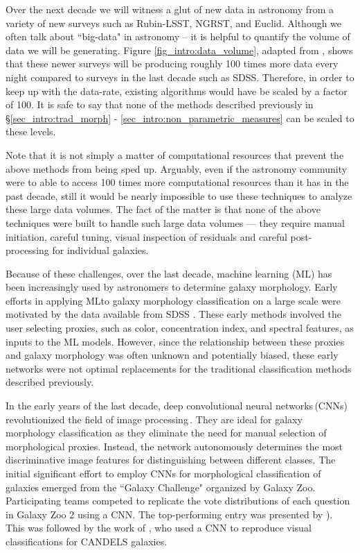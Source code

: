 Over the next decade we will witness a glut of new data in astronomy from a variety of new surveys such as Rubin-LSST, NGRST, and Euclid. Although we often talk about ``big-data" in astronomy -- it is helpful to quantify the volume of data we will be generating. Figure \ref{fig_intro:data_volume}, adapted from \citet{kremer_17}, shows that these newer surveys will be producing roughly 100 times more data every night compared to surveys in the last decade such as SDSS. Therefore, in order to keep up with the data-rate, existing algorithms would have be scaled by a factor of 100. It is safe to say that none of the methods described previously in \S \ref{sec_intro:trad_morph} - \ref{sec_intro:non_parametric_measures} can be scaled to these levels. 

Note that it is not simply a matter of computational resources that prevent the above methods from being sped up. Arguably, even if the astronomy community were to able to access 100 times more computational resources than it has in the past decade, still it would be nearly impossible to use these techniques to analyze these large data volumes. The fact of the matter is that none of the above techniques were built to handle such large data volumes --- they require manual initiation, careful tuning, visual inspection of residuals and careful post-processing for individual galaxies. 

Because of these challenges, over the last decade, machine learning (ML) has been increasingly used by astronomers to determine galaxy morphology. Early efforts in applying MLto galaxy morphology classification on a large scale were motivated by the data available from SDSS \citep[e.g.,][]{Ball2004GalaxyNetworks,Kelly2004MorphologicalSurvey,banerji_10}. These early methods involved the user selecting proxies, such as color, concentration index, and spectral features, as inputs to the ML models. However, since the relationship between these proxies and galaxy morphology was often unknown and potentially biased, these early networks were not optimal replacements for the traditional classification methods described previously. 

In the early years of the last decade, deep  convolutional neural networks\,(CNNs) revolutionized the field of image processing\,\citep[see][for an overview]{dl_1}. They are ideal for galaxy morphology classification as they eliminate the need for manual selection of morphological proxies. Instead, the network autonomously determines the most discriminative image features for distinguishing between different classes. The initial significant effort to employ CNNs for morphological classification of galaxies emerged from the ``Galaxy Challenge" organized by Galaxy Zoo. Participating teams competed to replicate the vote distributions of each question in Galaxy Zoo 2 using a CNN. The top-performing entry was presented by \citealp{Dieleman2015Rotation-invariantPrediction}). This was followed by the work of \citet{Huertas-Company2015ALEARNING}, who used a CNN to reproduce visual classifications for CANDELS galaxies.

